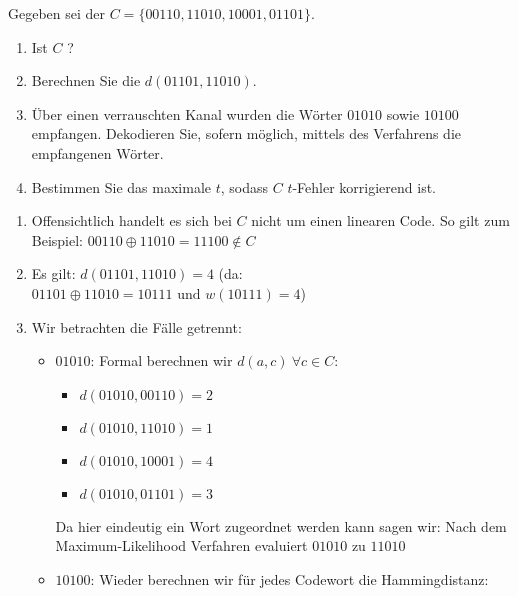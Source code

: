 \begin{aufgabe}[Codes][4]
Gegeben sei der  $C = \{ 00110, 11010, 10001, 01101 \}$.
\begin{enumerate}[label=\alph*)]
    \item Ist $C$ ?
    \item Berechnen Sie die  $d(01101, 11010)$.
    \item Über einen verrauschten Kanal wurden die Wörter $01010$ sowie $10100$ empfangen.
    Dekodieren Sie, sofern möglich, mittels des  Verfahrens die empfangenen Wörter.
    \item Bestimmen Sie das maximale $t$, sodass $C$ $t$-Fehler korrigierend ist.
\end{enumerate}
\Splitter
\vspace{-1\baselineskip}
\begin{enumerate}[label=\alph*)]\narrowitems
    \item Offensichtlich handelt es sich bei $C$ nicht um einen linearen Code. So gilt zum Beispiel: \(00110 \oplus 11010 = 11100 \not\in C\)
    \item Es gilt: \(d(01101, 11010) = 4\) (da: \(01101 \oplus 11010 = 10111 \text{ und } w(10111) = 4\))
    \item Wir betrachten die Fälle getrennt:
    \begin{itemize}[label=--]\narrowitems
        \item $01010$: Formal berechnen wir \(d(a, c)~\forall c \in C\): \begin{multicols}{2}
            \begin{itemize}[label=]\narrowitems
                \item \(d(01010, 00110) = 2\)
                \item \(d(01010, 11010) = 1\)
                \item \(d(01010, 10001) = 4\)
                \item \(d(01010, 01101) = 3\)
            \end{itemize}
        \end{multicols}
        Da hier eindeutig ein Wort zugeordnet werden kann sagen wir: Nach dem Maximum-Likelihood Verfahren evaluiert $01010$ zu $11010$
        \item $10100$: Wieder berechnen wir für jedes Codewort die Hammingdistanz:
        \begin{multicols}{2}
            \begin{itemize}[label=]\narrowitems

\end{itemize}
\end{multicols}
\end{itemize}
\end{enumerate}
\end{aufgabe}
